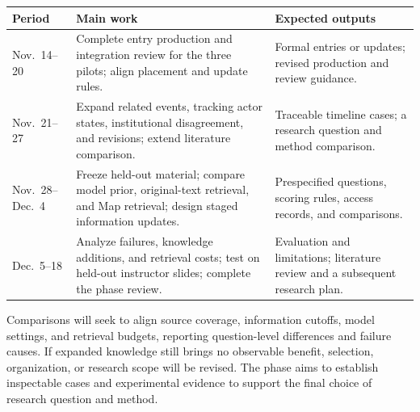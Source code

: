 \documentclass[11pt,letterpaper]{article}
\begin{document}
\begin{center}
\small
\begin{tabularx}{\textwidth}{@{}L{0.16\textwidth}Y L{0.28\textwidth}@{}}
\toprule
Period & Main work & Expected outputs \\
\midrule
Nov.\ 14--20 & Complete entry production and integration review for the three pilots; align placement and update rules. & Formal entries or updates; revised production and review guidance. \\
Nov.\ 21--27 & Expand related events, tracking actor states, institutional disagreement, and revisions; extend literature comparison. & Traceable timeline cases; a research question and method comparison. \\
Nov.\ 28--Dec.\ 4 & Freeze held-out material; compare model prior, original-text retrieval, and Map retrieval; design staged information updates. & Prespecified questions, scoring rules, access records, and comparisons. \\
Dec.\ 5--18 & Analyze failures, knowledge additions, and retrieval costs; test on held-out instructor slides; complete the phase review. & Evaluation and limitations; literature review and a subsequent research plan. \\
\bottomrule
\end{tabularx}
\end{center}

Comparisons will seek to align source coverage, information cutoffs, model settings, and retrieval budgets, reporting question-level differences and failure causes. If expanded knowledge still brings no observable benefit, selection, organization, or research scope will be revised. The phase aims to establish inspectable cases and experimental evidence to support the final choice of research question and method.
\end{document}
